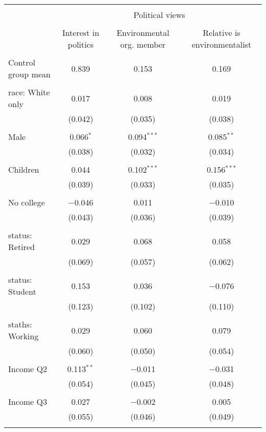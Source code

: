 
\begin{tabular}{@{\extracolsep{5pt}}lccc} 
\\[-1.8ex]\hline 
\hline \\[-1.8ex] 
 & \multicolumn{3}{c}{Political views} \\ 
\cline{2-4} 
\\[-1.8ex] & Interest in politics & Environmental org. member & Relative is environmentalist \\ 
\hline \\[-1.8ex] 
 Control group mean & 0.839 & 0.153 & 0.169  \\ \hline \\[-1.8ex] race: White only & 0.017 & 0.008 & 0.019 \\ 
  & (0.042) & (0.035) & (0.038) \\ 
  & & & \\ 
 Male & 0.066$^{*}$ & 0.094$^{***}$ & 0.085$^{**}$ \\ 
  & (0.038) & (0.032) & (0.034) \\ 
  & & & \\ 
 Children & 0.044 & 0.102$^{***}$ & 0.156$^{***}$ \\ 
  & (0.039) & (0.033) & (0.035) \\ 
  & & & \\ 
 No college & $-$0.046 & 0.011 & $-$0.010 \\ 
  & (0.043) & (0.036) & (0.039) \\ 
  & & & \\ 
 status: Retired & 0.029 & 0.068 & 0.058 \\ 
  & (0.069) & (0.057) & (0.062) \\ 
  & & & \\ 
 status: Student & 0.153 & 0.036 & $-$0.076 \\ 
  & (0.123) & (0.102) & (0.110) \\ 
  & & & \\ 
 staths: Working & 0.029 & 0.060 & 0.079 \\ 
  & (0.060) & (0.050) & (0.054) \\ 
  & & & \\ 
 Income Q2 & 0.113$^{**}$ & $-$0.011 & $-$0.031 \\ 
  & (0.054) & (0.045) & (0.048) \\ 
  & & & \\ 
 Income Q3 & 0.027 & $-$0.002 & 0.005 \\ 
  & (0.055) & (0.046) & (0.049) \\ 
  & & & \\ 

\end{tabular}
